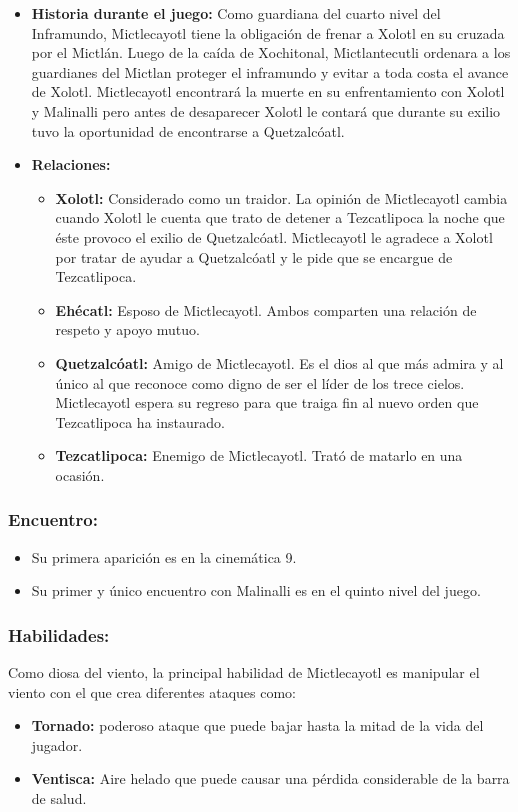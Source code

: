 \documentclass[11pt,letterpaper]{article}
\begin{document}
\begin{itemize}
	\item \textbf{Historia durante el juego:}
	Como guardiana del cuarto nivel del Inframundo, Mictlecayotl tiene la obligación de frenar a Xolotl en su cruzada por el Mictlán. Luego de la caída de Xochitonal, Mictlantecutli ordenara a los guardianes del Mictlan proteger el inframundo y evitar a toda costa el avance de Xolotl. Mictlecayotl encontrará la muerte en su enfrentamiento con Xolotl y Malinalli pero antes de desaparecer Xolotl le contará que durante su exilio tuvo la oportunidad de encontrarse a Quetzalcóatl.
	\item \textbf{Relaciones:}
	\begin{itemize}
		\item \textbf{Xolotl:} Considerado como un traidor. La opinión de Mictlecayotl cambia cuando Xolotl le cuenta que trato de detener a Tezcatlipoca la noche que éste provoco el exilio de Quetzalcóatl. Mictlecayotl le agradece a Xolotl por tratar de ayudar a Quetzalcóatl y le pide que se encargue de Tezcatlipoca.
		\item \textbf{Ehécatl:} Esposo de Mictlecayotl. Ambos comparten una relación de respeto y apoyo mutuo. 
		\item \textbf{Quetzalcóatl:} Amigo de Mictlecayotl. Es el dios al que más admira y al único al que reconoce como digno de ser el líder de los trece cielos. Mictlecayotl espera su regreso para que traiga fin al nuevo orden que Tezcatlipoca ha instaurado.
		\item \textbf{Tezcatlipoca:} Enemigo de Mictlecayotl. Trató de matarlo en una ocasión.  
	\end{itemize}			  
\end{itemize}


\subsubsection{Encuentro:}
\begin{itemize}
	\item Su primera aparición es en la cinemática 9. 
	\item Su primer y único encuentro con Malinalli es en el quinto nivel del juego.
\end{itemize}
\subsubsection{Habilidades:}
Como diosa del viento, la principal habilidad de Mictlecayotl es manipular el viento con el que crea diferentes ataques como:
\begin{itemize}
	\item \textbf{Tornado:}  poderoso ataque que puede bajar hasta la mitad de la vida del jugador.
	\item \textbf{Ventisca:} Aire helado que puede causar una pérdida considerable de la barra de salud.
\end{itemize}
\end{document}
